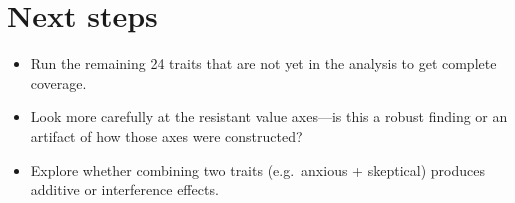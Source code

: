 \documentclass[11pt]{article}
\begin{document}
\section*{Next steps}

\begin{itemize}[leftmargin=1.5em]
    \item Run the remaining 24 traits that are not yet in the analysis to get complete coverage.
    \item Look more carefully at the resistant value axes---is this a robust finding or an artifact of how those axes were constructed?
    \item Explore whether combining two traits (e.g.\ anxious + skeptical) produces additive or interference effects.
\end{itemize}
\end{document}
